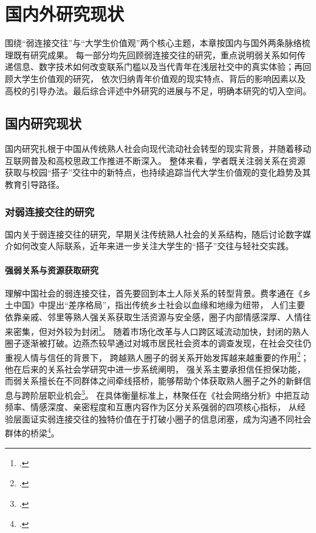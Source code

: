 \section{国内外研究现状}
\label{sec:research-status}

围绕“弱连接交往”与“大学生价值观”两个核心主题，本章按国内与国外两条脉络梳理既有研究成果。
每一部分均先回顾弱连接交往的研究，重点说明弱关系如何传递信息、数字技术如何改变联系门槛以及当代青年在浅层社交中的真实体验；再回顾大学生价值观的研究，
依次归纳青年价值观的现实特点、背后的影响因素以及高校的引导办法。最后综合评述中外研究的进展与不足，明确本研究的切入空间。

\subsection{国内研究现状}
\label{sec:domestic-research}

国内研究扎根于中国从传统熟人社会向现代流动社会转型的现实背景，并随着移动互联网普及和高校思政工作推进不断深入。
整体来看，学者既关注弱关系在资源获取与校园“搭子”交往中的新特点，也持续追踪当代大学生价值观的变化趋势及其教育引导路径。

\subsubsection{对弱连接交往的研究}

国内关于弱连接交往的研究，早期关注传统熟人社会的关系结构，随后讨论数字媒介如何改变人际联系，近年来进一步关注大学生的“搭子”交往与轻社交实践。

\paragraph{强弱关系与资源获取研究}
理解中国社会的弱连接交往，首先要回到本土人际关系的转型背景。费孝通在《乡土中国》中提出“差序格局”，指出传统乡土社会以血缘和地缘为纽带，
人们主要依靠亲戚、邻里等熟人强关系获取生活资源与安全感，圈子内部情感深厚、人情往来密集，但对外较为封闭\footcite{Fei2012}。
随着市场化改革与人口跨区域流动加快，封闭的熟人圈子逐渐被打破。边燕杰较早通过对城市居民社会资本的调查发现，在社会交往仍重视人情与信任的背景下，
跨越熟人圈子的弱关系开始发挥越来越重要的作用\footcite{ZSHK200403011}；他在后来的关系社会学研究中进一步系统阐明，
强关系主要承担信任担保功能，而弱关系擅长在不同群体之间牵线搭桥，能够帮助个体获取熟人圈子之外的新鲜信息与跨阶层职业机会\footcite{Bian2021}。
在具体衡量标准上，林聚任在《社会网络分析》中把互动频率、情感深度、亲密程度和互惠内容作为区分关系强弱的四项核心指标，
从经验层面证实弱连接交往的独特价值在于打破小圈子的信息闭塞，成为沟通不同社会群体的桥梁\footcite{Lin2009}。

